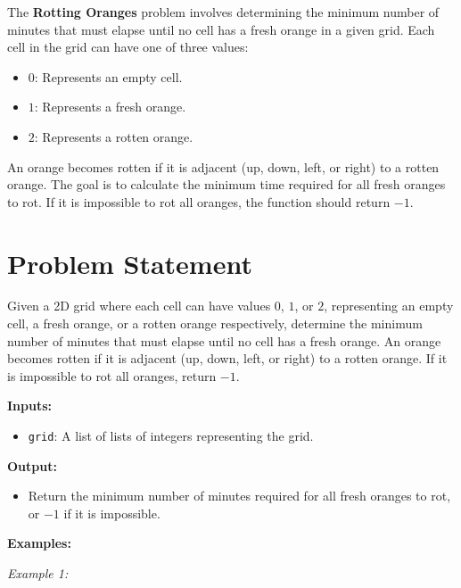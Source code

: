 
\label{problem:rotting_oranges}

The \textbf{Rotting Oranges} problem involves determining the minimum number of minutes that must elapse until no cell has a fresh orange in a given grid. Each cell in the grid can have one of three values:
\begin{itemize}
    \item \(0\): Represents an empty cell.
    \item \(1\): Represents a fresh orange.
    \item \(2\): Represents a rotten orange.
\end{itemize}

An orange becomes rotten if it is adjacent (up, down, left, or right) to a rotten orange. The goal is to calculate the minimum time required for all fresh oranges to rot. If it is impossible to rot all oranges, the function should return \(-1\).

\section*{Problem Statement}

Given a 2D grid where each cell can have values \(0\), \(1\), or \(2\), representing an empty cell, a fresh orange, or a rotten orange respectively, determine the minimum number of minutes that must elapse until no cell has a fresh orange. An orange becomes rotten if it is adjacent (up, down, left, or right) to a rotten orange. If it is impossible to rot all oranges, return \(-1\).

\textbf{Inputs:}
\begin{itemize}
    \item \texttt{grid}: A list of lists of integers representing the grid.
\end{itemize}

\textbf{Output:}
\begin{itemize}
    \item Return the minimum number of minutes required for all fresh oranges to rot, or \(-1\) if it is impossible.
\end{itemize}

\textbf{Examples:}

\textit{Example 1:}

